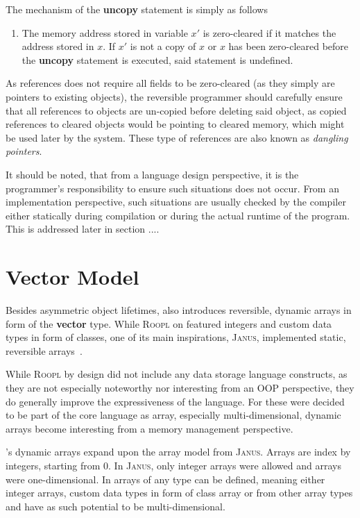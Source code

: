 The mechanism of the \textbf{uncopy} statement is simply as follows
\begin{enumerate}
    \item The memory address stored in variable $x'$ is zero-cleared if it matches the address stored in $x$. If $x'$ is not a copy of $x$ or $x$ has been zero-cleared before the \textbf{uncopy} statement is executed, said statement is undefined.
\end{enumerate}
As references does not require all fields to be zero-cleared (as they simply are pointers to existing objects), the reversible programmer should carefully ensure that all references to objects are un-copied before deleting said object, as copied references to cleared objects would be pointing to cleared memory, which might be used later by the system. These type of references are also known as \textit{dangling pointers}.

It should be noted, that from a language design perspective, it is the programmer's responsibility to ensure such situations does not occur. From an implementation perspective, such situations are usually checked by the compiler either statically during compilation or during the actual runtime of the program. This is addressed later in section .... %


\section{Vector Model}
\label{sec:vector-model}
Besides asymmetric object lifetimes, \rooplpp also introduces reversible, dynamic arrays in form of the \textbf{vector} type. While \textsc{Roopl} on featured integers and custom data types in form of classes, one of its main inspirations, \textsc{Janus}, implemented static, reversible arrays~\cite{ty:janus}. 

While \textsc{Roopl} by design did not include any data storage language constructs, as they are not especially noteworthy nor interesting from an OOP perspective, they do generally improve the expressiveness of the language. For \rooplpp these were decided to be part of the core language as array, especially multi-dimensional, dynamic arrays become interesting from a memory management perspective.

\rooplpp's dynamic arrays expand upon the array model from \textsc{Janus}. Arrays are index by integers, starting from 0. In \textsc{Janus}, only integer arrays were allowed and arrays were one-dimensional. In \rooplpp arrays of any type can be defined, meaning either integer arrays, custom data types in form of class array or from other array types and have as such potential to be multi-dimensional. 

